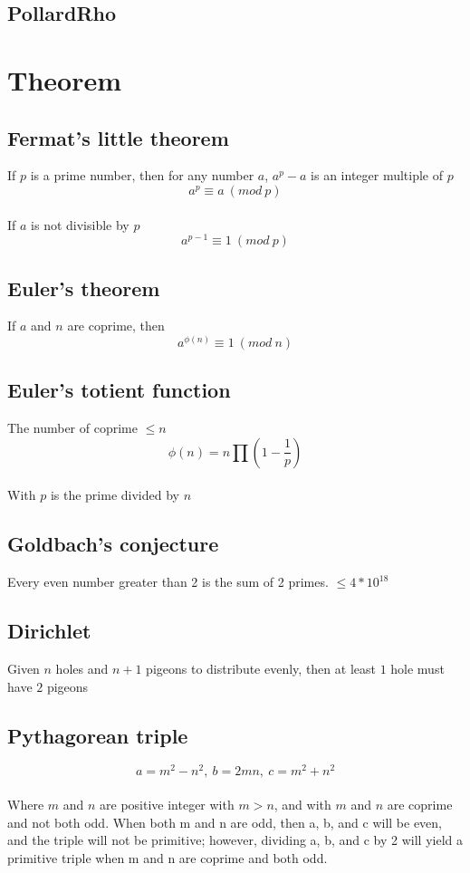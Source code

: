 \documentclass[a4paper, 12pt, oneside, landscape]{article}
\begin{document}
\begin{multicols}{2}
	\subsection{PollardRho}
	

\section{Theorem}
	\subsection{Fermat's little theorem}
	If $p$ is a prime number, then for any number $a$, \(a^p - a\) is an integer multiple of $p$ \\
	\[a ^ p \equiv a \ (mod \ p)\]  \\
	If $a$ is not divisible by $p$ \\
	\[a ^ {p - 1} \equiv 1 \ (mod \ p)\] 
	
	\subsection{Euler's theorem}
	If $a$ and $n$ are coprime, then 
	\[a ^ {\phi(n)} \equiv 1 \ (mod \ n) \]
	
	\subsection{Euler's totient function}
	The number of coprime $\leq n$ \\
	\[\phi(n) = n \prod (1 - \frac{1}{p}) \] \\
	With $p$ is the prime divided by $n$
	
	\subsection{Goldbach's conjecture}
	Every even number greater than 2 is the sum of 2 primes. \(\leq 4 * 10^{18}\)
	
	\subsection{Dirichlet}
	Given $n$ holes and $n + 1$ pigeons to distribute evenly, then at least $1$ hole must have $2$ pigeons
	
	\subsection{Pythagorean triple}
	\[a = m^2 - n^2, \ b = 2mn, \ c = m^2 + n^2 \] \\
	Where $m$ and $n$ are positive integer with $m > n$, and with $m$ and $n$ are coprime and not both odd. When both m and n are odd, then a, b, and c will be even, and the triple will not be primitive; however, dividing a, b, and c by 2 will yield a primitive triple when m and n are coprime and both odd.
	

\end{multicols}
\end{document}
